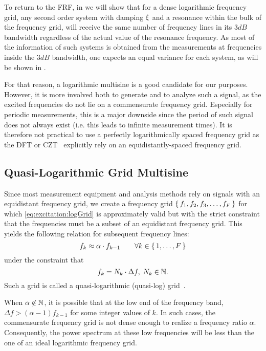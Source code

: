   To return to the \gls{FRF}, in  we will show that for a dense logarithmic frequency grid, any second order system with damping $\xi_{}$ and a resonance within the bulk of the frequency grid, will receive the same number of frequency lines in its $3 \unit{dB}$ bandwidth regardless of the actual value of the resonance frequency.
  As most of the information of such systems is obtained from the measurements at frequencies inside the $3 \unit{dB}$
  bandwidth, one expects an equal variance for each system, as will be shown in .
  
  For that reason, a logarithmic multisine is a good candidate for our purposes.
  However, it is more involved both to generate and to analyze such a signal, as the excited frequencies do not lie on a commensurate frequency grid.
  Especially for periodic measurements, this is a major downside since the period of such signal does not always exist (i.e. this leads to infinite measurement times).
  It is therefore not practical to use a perfectly logarithmically spaced frequency grid as the \gls{DFT} or \gls{CZT}~\citep{Rabiner2004} explicitly rely on an equidistantly-spaced frequency grid.
  
\subsection{Quasi-Logarithmic Grid Multisine}
  Since most measurement equipment and analysis methods rely on signals with an equidistant frequency grid, we create a frequency grid
  $\set{f_1, f_2, f_3,\ldots, f_F}$ for which \eqref{eq:excitation:logGrid} is approximately valid but with the strict constraint that the frequencies must be a subset  of an equidistant frequency grid. 
  This yields the following relation for  subsequent frequency lines:
  \begin{equation}
    f_k \approx \alpha \cdot f_{k-1}
    \qquad \forall k \in \set{1,\ldots,F}
  \label{eq:excitation:qlogGrid}
  \end{equation}
  under the constraint that
  \begin{equation}
    f_k = N_k \cdot \Delta f,\; N_k \in \mathbb{N}
    \text{.}
    \label{eq:excitation:constraintLinGrid}
  \end{equation}
  Such a grid is called a quasi-logarithmic (quasi-log) grid~\citep{Pintelon2012}. 

  \begin{remark}
  When $\alpha \not\in \mathbb{N}$, it is possible that at the low end of the frequency band, $\Delta f > \left(\alpha -1 \right) f_{k-1}$ for some integer values of $k$.
  In such cases, the commensurate frequency grid is not dense enough to realize a frequency ratio $\alpha$.
  Consequently, the power spectrum at these low frequencies will be less than the one of an ideal logarithmic frequency grid.
  \end{remark}

